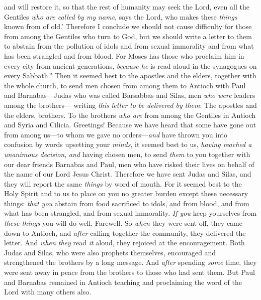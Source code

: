 \begin{biblechapter}
and will restore it,
\verse so that the rest of humanity may seek the Lord, 
even all the Gentiles \textit{who are called by my name}, 
says the Lord, who makes these \textit{things}
\verse known from of old.’
\verse Therefore I conclude we should not cause difficulty for those from among the Gentiles who turn to God,
\verse but we should write a letter to them to abstain from the pollution of idols and from sexual immorality and from what has been strangled and from blood.
\verse For Moses has those who proclaim him in every city from ancient generations, \textit{because he} is read aloud in the synagogues on every Sabbath.”
 Then it seemed best to the apostles and the elders, together with the whole church, to send men chosen from among them to Antioch with Paul and Barnabas—Judas who was called Barsabbas and Silas, men \textit{who were} leaders among the brothers—
\verse writing \textit{this letter} \textit{to be delivered by them}: The apostles and the elders, brothers. To the brothers \textit{who are} from among the Gentiles in Antioch and Syria and Cilicia. Greetings!
\verse Because we have heard that some have gone out from among us—to whom we gave no orders—\textit{and} have thrown you into confusion by words upsetting your \textit{minds},
\verse it seemed best to us, \textit{having reached a unanimous decision}, \textit{and} having chosen men, to send \textit{them} to you together with our dear friends Barnabas and Paul,
\verse men who have risked their lives on behalf of the name of our Lord Jesus Christ.
\verse Therefore we have sent Judas and Silas, and they will report the same \textit{things} by word of mouth.
\verse For it seemed best to the Holy Spirit and to us to place on you no greater burden except these necessary things:
\verse \textit{that you} abstain from food sacrificed to idols, and from blood, and from what has been strangled, and from sexual immorality. \textit{If you} keep yourselves from \textit{these things} you will do well. Farewell.
 So \textit{when} they were sent off, they came down to Antioch, and \textit{after} calling together the community, they delivered the letter.
\verse And \textit{when they} read \textit{it} aloud, they rejoiced at the encouragement.
\verse Both Judas and Silas, who were also prophets themselves, encouraged and strengthened the brothers by a long message.
\verse And \textit{after} spending \textit{some} time, they were sent away in peace from the brothers to those who had sent them.
\verse But Paul and Barnabas remained in Antioch teaching and proclaiming the word of the Lord with many others also.

\end{biblechapter}
